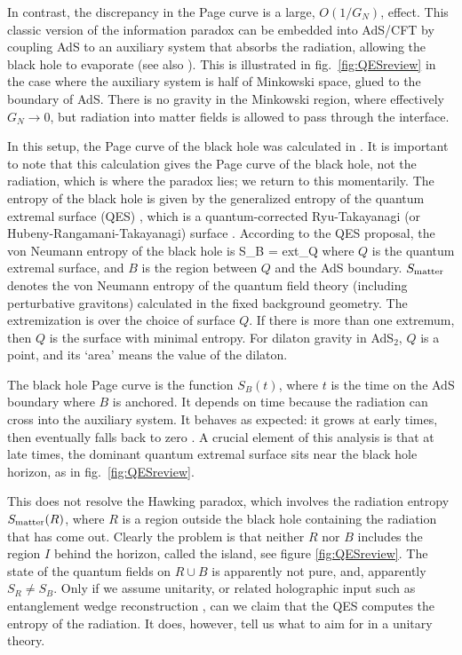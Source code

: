 In contrast, the discrepancy in the Page curve is a large, $O(1/G_N)$, effect. This classic version of the information paradox can be embedded into AdS/CFT by coupling AdS to an auxiliary system that absorbs the radiation, allowing the black hole to evaporate \cite{Penington:2019npb,Almheiri:2019psf} (see also \cite{Rocha:2008fe, Mertens:2019bvy, Engelsoy:2016xyb}). This is illustrated in fig.~\ref{fig:QESreview} in the case where the auxiliary system is half of Minkowski space, glued to the boundary of AdS. There is no gravity in the Minkowski region, where effectively $G_N \to 0$, but radiation into matter fields is allowed to pass through the interface.

In this setup, the Page curve of the black hole was calculated   in 
\cite{Penington:2019npb,Almheiri:2019psf}. It is important to note that this calculation gives the Page curve of the black hole, not the radiation, which is where the paradox lies; we return to this momentarily.
The entropy of the black hole is given by the generalized entropy of the quantum extremal surface (QES) \cite{Engelhardt:2014gca}, which is a quantum-corrected  Ryu-Takayanagi (or Hubeny-Rangamani-Takayanagi) surface \cite{Ryu:2006bv,Hubeny:2007xt}. According to the QES proposal, the von Neumann entropy of the black hole is
\be\label{introsbh}
S_B = \mbox{ext}_Q 
\ee
where $Q$ is the quantum extremal surface, and $B$ is the region between $Q$ and the AdS boundary. $S_{\rm matter}$ denotes the von Neumann entropy of the  quantum field theory (including perturbative gravitons) calculated in the fixed background geometry. The extremization is over the choice of surface $Q$. If there is more than one extremum, then $Q$ is the surface with minimal entropy. For dilaton gravity in AdS$_2$, $Q$ is a point, and its `area' means the value of the dilaton.





The black hole Page curve  is the function $S_B(t)$, where $t$ is the time on the AdS boundary where $B$ is anchored. 
It depends on time  because the radiation can cross into the auxiliary system. 
It behaves as expected: it grows at early times, then eventually falls back to zero \cite{Penington:2019npb,Almheiri:2019psf}. A crucial element of this analysis is that at late times, the dominant quantum extremal surface sits near the black hole horizon, as in fig.~\ref{fig:QESreview}.

This does not resolve the Hawking paradox, 
 which involves the radiation entropy $S_{\rm matter}(R)$, where $R$ is a region outside the black hole containing the radiation that has come out. 
Clearly the problem is that neither $R$ nor $B$ includes the region $I$ behind the horizon, called the island, 
see figure \ref{fig:QESreview}. The state of the quantum fields on $R \cup B$ is apparently not pure, and, apparently  $S_R \neq S_B$. Only if we assume unitarity, or related holographic input such as entanglement wedge reconstruction \cite{Penington:2019npb}, can we claim that the QES computes the entropy of the radiation.  
It does, however, tell us what to aim for in a unitary theory.

